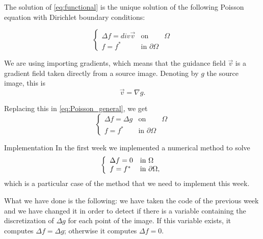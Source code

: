 \documentclass[11pt]{beamer}
\begin{document}
\begin{frame}
The solution of \ref{eq:functional}  is the unique solution of the following Poisson equation with Dirichlet boundary conditions:

\begin{equation}
\left\{\begin{matrix}
 \Delta f=div \overrightarrow{v} & \text{on } & \Omega\\ 
 f=f^{*}& \text{in }\partial\Omega
\end{matrix}\right.
\label{eq:Poisson_general}
\end{equation}

We are using importing gradients, which means that the guidance field $\overrightarrow{v}$ is a gradient field taken directly from a source image. Denoting
by $g$ the source image, this is
$$\overrightarrow{v} = \nabla g.$$

Replacing this in \ref{eq:Poisson_general}, we get
\begin{equation}
\left\{\begin{matrix}
 \Delta f=\Delta g & \text{on } & \Omega\\ 
 f=f^{*}& \text{in }\partial\Omega
\end{matrix}\right.
\end{equation}

\end{frame}

\begin{frame}{Implementation}
In the first week we implemented a numerical method to solve
$$\left\lbrace
\begin{array}{l l}

\Delta f = 0& \text{in }\Omega \\
f = f^* & \text{in }\partial\Omega,

\end{array}\right.
$$
which is a particular case of the method that we need to implement this week. 

What we have done is the following: we have taken the code of the previous week and we have changed it in order to detect if there is a variable containing the discretization of $\Delta g$ for each point of the image. If this variable exists, it computes $\Delta f = \Delta g$; otherwise it computes $\Delta f = 0$.
\end{frame}
\end{document}
